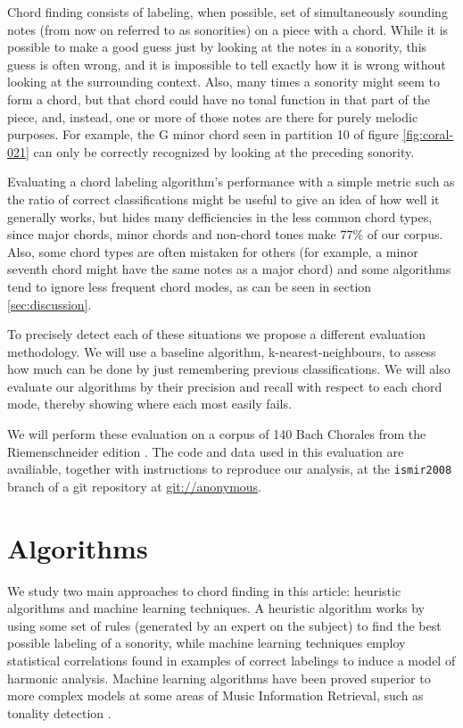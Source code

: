 \documentclass{article}
\begin{document}
Chord finding consists of labeling, when possible, set of
simultaneously sounding notes (from now on referred to as sonorities)
on a piece with a chord. While it is possible to make a good guess
just by looking at the notes in a sonority, this guess is often wrong,
and it is impossible to tell exactly how it is wrong without looking
at the surrounding context. Also, many times a sonority might seem to
form a chord, but that chord could have no tonal function in that part
of the piece, and, instead, one or more of those notes are there for
purely melodic purposes. For example, the G minor chord seen in
partition 10 of figure \ref{fig:coral-021} can only be correctly
recognized by looking at the preceding sonority. 

Evaluating a chord labeling algorithm's performance with a simple
metric such as the ratio of correct classifications might be useful to
give an idea of how well it generally works, but hides many
defficiencies in the less common chord types, since major chords,
minor chords and non-chord tones make $77\%$ of our corpus. Also, some
chord types are often mistaken for others (for example, a minor
seventh chord might have the same notes as a major chord) and some
algorithms tend to ignore less frequent chord modes, as can be seen in
section \ref{sec:discussion}. 

To precisely detect each of these situations we propose a different
evaluation methodology. We will use a baseline algorithm,
k-nearest-neighbours, to assess how much can be done by just
remembering previous classifications. We will also evaluate our
algorithms by their precision and recall with respect to each chord
mode, thereby showing where each most easily fails. 

We will perform these evaluation on a corpus of 140 Bach Chorales from
the Riemenschneider edition \cite{bach:371}. The code and data used in
this evaluation are availiable, together with instructions to
reproduce our analysis, at the \texttt{ismir2008} branch of a git
\cite{baudis:git} repository at \url{git://anonymous}.

\section{Algorithms}
\label{sec:algorithms}


We study two main approaches to chord finding in this article:
heuristic algorithms and machine learning techniques. A heuristic
algorithm works by using some set of rules (generated by an expert on
the subject) to find the best possible labeling of a sonority, while
machine learning techniques employ statistical correlations found in
examples of correct labelings to induce a model of harmonic
analysis. Machine learning algorithms have been proved superior to
more complex models at some areas of Music Information Retrieval, such
as tonality detection \cite{gomez.ea:estimating}.
\end{document}
